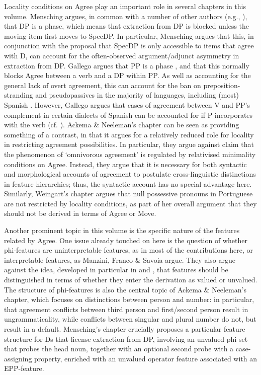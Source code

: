 \documentclass[output=paper]{langsci/langscibook}
\begin{document}
Locality conditions on Agree play an important role in several chapters in this volume. Mensching argues, in common with a number of other authors (e.g., \citealt{Svenonius2004,Bošković2005,Heck2009,Reeve2018}), that DP is a phase, which means that extraction from DP is blocked unless the moving item first moves to SpecDP. In particular, Mensching argues that this, in conjunction with the proposal that SpecDP is only accessible to items that agree with D, can account for the often-observed argument/adjunct asymmetry in extraction from DP. Gallego argues that PP is a phase \citep{Abels2003,Abels2012}, and that this normally blocks Agree between a verb and a DP within PP. As well as accounting for the general lack of overt agreement, this can account for the ban on preposition-stranding and pseudopassives in the majority of languages, including (most) Spanish \citep{Law2006}. However, Gallego argues that cases of agreement between V and PP’s complement in certain dialects of Spanish can be accounted for if P incorporates with the verb (cf. \citealt{Hornstein1981,Law2006}). Ackema \& Neeleman’s chapter can be seen as providing something of a contrast, in that it argues for a relatively reduced role for locality in restricting agreement possibilities. In particular, they argue against  claim that the phenomenon of ‘omnivorous agreement’ is regulated by relativised minimality conditions on Agree. Instead, they argue that it is necessary for both syntactic and morphological accounts of agreement to postulate cross-linguistic distinctions in feature hierarchies; thus, the syntactic account has no special advantage here. Similarly, Weingart’s chapter argues that null possessive pronouns in Portuguese are not restricted by locality conditions, as part of her overall argument that they should not be derived in terms of Agree or Move.

Another prominent topic in this volume is the specific nature of the features related by Agree. One issue already touched on here is the question of whether phi-features are uninterpretable features, as in most of the contributions here, or interpretable features, as Manzini, Franco \& Savoia argue. They also argue against the idea, developed in particular in \citet{Chomsky2000} and \citet{Pesetsky2007}, that features should be distinguished in terms of whether they enter the derivation as valued or unvalued. The structure of phi-features is also the central topic of Ackema \& Neeleman’s chapter, which focuses on distinctions between person and number: in particular, that agreement conflicts between third person and first\slash second person result in ungrammaticality, while conflicts between singular and plural number do not, but result in a default. Mensching’s chapter crucially proposes a particular feature structure for Ds that license extraction from DP, involving an unvalued phi-set that probes the head noun, together with an optional second probe with a case-assigning property, enriched with an unvalued operator feature associated with an EPP-feature.
\end{document}
